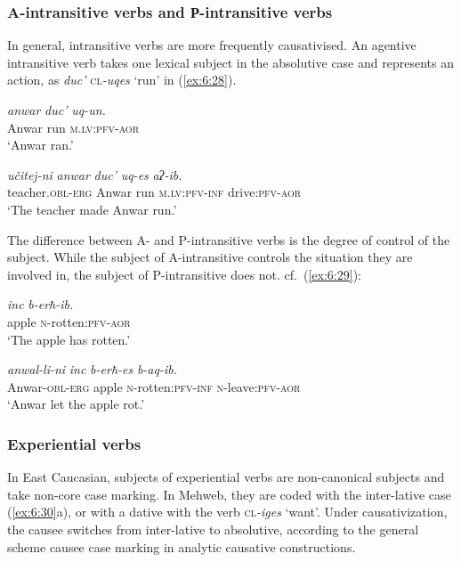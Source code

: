 ﻿\documentclass[output=paper]{langsci/langscibook}
\begin{document}
\subsubsection{A-intransitive verbs and Р-intransitive verbs}

In general, intransitive verbs are more frequently causativised. An
agentive intransitive verb takes one lexical subject in the absolutive
case and represents an action, as \emph{duc'} \textsc{cl}\emph{-uqes}
`run' in (\ref{ex:6:28}).

\ea \label{ex:6:28} %
\ea %
\gll \emph{anwar} \emph{duc'} \emph{uq-un.}  \\
Anwar run \textsc{m}.\textsc{lv}:\textsc{pfv}-\textsc{aor} \\
\glt `Anwar ran.'

\ex %
\gll \emph{učitej-ni} \emph{anwar} \emph{duc'} \emph{uq-es} \emph{aʔ-ib.}\\
teacher.\textsc{obl}-\textsc{erg} Anwar run \textsc{m}.\textsc{lv}:\textsc{pfv}-\textsc{inf} drive:\textsc{pfv}-\textsc{aor}\\
\glt `The teacher made Anwar run.'
\z
\z

The difference between A- and P-intransitive verbs is the degree of
control of the subject. While the subject of A-intransitive controls the
situation they are involved in, the subject of P-intransitive does not.
cf.\ (\ref{ex:6:29}):

\ea \label{ex:6:29} %
\ea %
\gll \emph{inc} \emph{b-erħ-ib.}\\
apple \textsc{n}-rotten:\textsc{pfv}-\textsc{aor}\\
\glt `The apple has rotten.'

\ex %
\gll \emph{anwal-li-ni} \emph{inc} \emph{b-erħ-es} \emph{b-aq-ib.} \\
Anwar-\textsc{obl}-\textsc{erg} apple \textsc{n}-rotten:\textsc{pfv}-\textsc{inf} \textsc{n}-leave:\textsc{pfv}-\textsc{aor}\\
\glt `Anwar let the apple rot.'
\z
\z

\subsubsection{Experiential verbs}

In East Caucasian, subjects of experiential verbs are non-canonical
subjects and take non-core case marking. In Mehweb, they are coded with
the inter-lative case (\ref{ex:6:30}a), or with a dative with the verb
\textsc{cl}\emph{-iges} `want'. Under causativization, the causee
switches from inter-lative to absolutive, according to the
general scheme causee case marking in analytic causative constructions.
\end{document}

